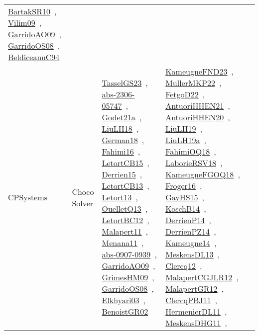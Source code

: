 {\begin{longtable}{lp{3cm}>{\raggedright\arraybackslash}p{6cm}>{\raggedright\arraybackslash}p{6cm}>{\raggedright\arraybackslash}p{8cm}}
\href{../works/BartakSR10.pdf}{BartakSR10}~\cite{BartakSR10}, \href{../works/Vilim09.pdf}{Vilim09}~\cite{Vilim09}, \href{../works/GarridoAO09.pdf}{GarridoAO09}~\cite{GarridoAO09}, \href{../works/GarridoOS08.pdf}{GarridoOS08}~\cite{GarridoOS08}, \href{../works/BeldiceanuC94.pdf}{BeldiceanuC94}~\cite{BeldiceanuC94}\\
\index{Choco Solver}\index{CPSystems!Choco Solver}CPSystems & Choco Solver & \href{../works/TasselGS23.pdf}{TasselGS23}~\cite{TasselGS23}, \href{../works/abs-2306-05747.pdf}{abs-2306-05747}~\cite{abs-2306-05747}, \href{../works/Godet21a.pdf}{Godet21a}~\cite{Godet21a}, \href{../works/LiuLH18.pdf}{LiuLH18}~\cite{LiuLH18}, \href{../works/German18.pdf}{German18}~\cite{German18}, \href{../works/Fahimi16.pdf}{Fahimi16}~\cite{Fahimi16}, \href{../works/LetortCB15.pdf}{LetortCB15}~\cite{LetortCB15}, \href{../works/Derrien15.pdf}{Derrien15}~\cite{Derrien15}, \href{../works/LetortCB13.pdf}{LetortCB13}~\cite{LetortCB13}, \href{../works/Letort13.pdf}{Letort13}~\cite{Letort13}, \href{../works/OuelletQ13.pdf}{OuelletQ13}~\cite{OuelletQ13}, \href{../works/LetortBC12.pdf}{LetortBC12}~\cite{LetortBC12}, \href{../works/Malapert11.pdf}{Malapert11}~\cite{Malapert11}, \href{../works/Menana11.pdf}{Menana11}~\cite{Menana11}, \href{../works/abs-0907-0939.pdf}{abs-0907-0939}~\cite{abs-0907-0939}, \href{../works/GarridoAO09.pdf}{GarridoAO09}~\cite{GarridoAO09}, \href{../works/GrimesHM09.pdf}{GrimesHM09}~\cite{GrimesHM09}, \href{../works/GarridoOS08.pdf}{GarridoOS08}~\cite{GarridoOS08}, \href{../works/Elkhyari03.pdf}{Elkhyari03}~\cite{Elkhyari03}, \href{../works/BenoistGR02.pdf}{BenoistGR02}~\cite{BenoistGR02} & \href{../works/KameugneFND23.pdf}{KameugneFND23}~\cite{KameugneFND23}, \href{../works/MullerMKP22.pdf}{MullerMKP22}~\cite{MullerMKP22}, \href{../works/FetgoD22.pdf}{FetgoD22}~\cite{FetgoD22}, \href{../works/AntuoriHHEN21.pdf}{AntuoriHHEN21}~\cite{AntuoriHHEN21}, \href{../works/AntuoriHHEN20.pdf}{AntuoriHHEN20}~\cite{AntuoriHHEN20}, \href{../works/LiuLH19.pdf}{LiuLH19}~\cite{LiuLH19}, \href{../works/LiuLH19a.pdf}{LiuLH19a}~\cite{LiuLH19a}, \href{../works/FahimiOQ18.pdf}{FahimiOQ18}~\cite{FahimiOQ18}, \href{../works/LaborieRSV18.pdf}{LaborieRSV18}~\cite{LaborieRSV18}, \href{../works/KameugneFGOQ18.pdf}{KameugneFGOQ18}~\cite{KameugneFGOQ18}, \href{../works/Froger16.pdf}{Froger16}~\cite{Froger16}, \href{../works/GayHS15.pdf}{GayHS15}~\cite{GayHS15}, \href{../works/KoschB14.pdf}{KoschB14}~\cite{KoschB14}, \href{../works/DerrienP14.pdf}{DerrienP14}~\cite{DerrienP14}, \href{../works/DerrienPZ14.pdf}{DerrienPZ14}~\cite{DerrienPZ14}, \href{../works/Kameugne14.pdf}{Kameugne14}~\cite{Kameugne14}, \href{../works/MeskensDL13.pdf}{MeskensDL13}~\cite{MeskensDL13}, \href{../works/Clercq12.pdf}{Clercq12}~\cite{Clercq12}, \href{../works/MalapertCGJLR12.pdf}{MalapertCGJLR12}~\cite{MalapertCGJLR12}, \href{../works/MalapertGR12.pdf}{MalapertGR12}~\cite{MalapertGR12}, \href{../works/ClercqPBJ11.pdf}{ClercqPBJ11}~\cite{ClercqPBJ11}, \href{../works/HermenierDL11.pdf}{HermenierDL11}~\cite{HermenierDL11}, \href{../works/MeskensDHG11.pdf}{MeskensDHG11}~\cite{MeskensDHG11}, 
\end{longtable}}
